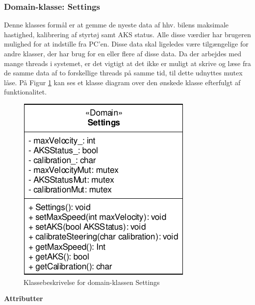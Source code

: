 \subsubsection{Domain-klasse: Settings}

Denne klasses formål er at gemme de nyeste data af hhv. bilens maksimale hastighed, kalibrering af styrtøj samt AKS status. Alle disse værdier har brugeren mulighed for at indstille fra PC'en. Disse data skal ligeledes være tilgængelige for andre klasser, der har brug for en eller flere af disse data. Da der arbejdes med mange threads i systemet, er det vigtigt at det ikke er muligt at skrive og læse fra de samme data af to forskellige threads på samme tid, til dette udnyttes mutex låse. På Figur \ref{fig:cd_settings} kan ses et klasse diagram over den ønskede klasse efterfulgt af funktionalitet.

\begin{figure}[h]
\centering
\includegraphics[]{../fig/diagrammer/bil/cd_settings.pdf}
\caption{Klassebeskrivelse for domain-klassen Settings}
\label{fig:cd_settings}
\end{figure}

\textbf{Attributter}

